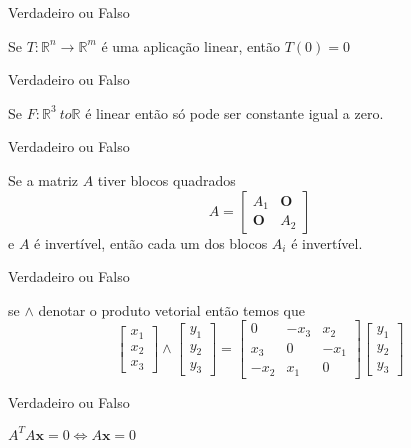 \documentclass{beamer}
\begin{document}
\begin{frame}{Verdadeiro ou Falso}
  \begin{block}{1}
Se $T: \mathbb{R}^n \to \mathbb{R}^m$ é uma aplicação linear, então $T(0)=0$
\end{block}
\end{frame}

\begin{frame}{Verdadeiro ou Falso}
  \begin{block}{2}
  Se $F:\mathbb{R}^3 \ to \mathbb{R}$ é linear então só pode ser constante igual a zero.
\end{block}
\end{frame}

\begin{frame}{Verdadeiro ou Falso}
  \begin{block}{3}
  Se a matriz $A$ tiver blocos quadrados
  $$ A = \begin{bmatrix}
    A_1 & \mathbf{O} \\
    \mathbf{O} & A_2
  \end{bmatrix}$$ e $A$ é invertível, então cada um dos blocos $A_i$ é invertível.
\end{block}
\end{frame}   

\begin{frame}{Verdadeiro ou Falso}
  \begin{block}{4}
  se $\wedge$ denotar o produto vetorial então temos que
  $$\begin{bmatrix}
    x_1 \\ x_2 \\ x_3 
  \end{bmatrix} \wedge \begin{bmatrix}
    y_1 \\ y_2 \\ y_3
  \end{bmatrix} = \begin{bmatrix}
    0 & -x_3 & x_2 \\
    x_3 & 0 & -x_1 \\
    -x_2  & x_1 &0
  \end{bmatrix}\begin{bmatrix}
    y_1 \\ y_2 \\ y_3
  \end{bmatrix}
  $$
\end{block}
\end{frame}

\begin{frame}{Verdadeiro ou Falso}
  \begin{block}{5}
$A^TA\mathbf{x}=0 \iff A\mathbf{x}=0$
\end{block}
\end{frame}
\end{document}
